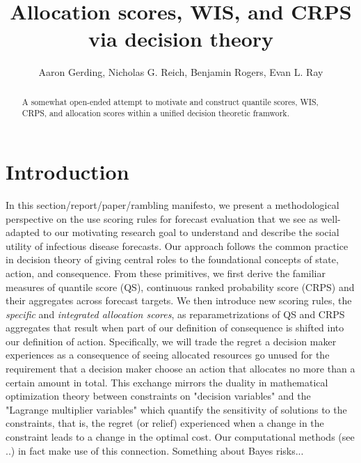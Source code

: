 \documentclass{article}
\title{Allocation scores, WIS, and CRPS via decision theory}
\author{Aaron Gerding, Nicholas G. Reich, Benjamin Rogers, Evan L. Ray}
\begin{document}
\newcommand{\del}[2]{\frac{\partial {#1} }{\partial {#2}} }
\newcommand{\dby}[2]{\frac{d {#1} }{d {#2}} }
\newcommand{\sbar}{\overline{s}}
\newtheorem{proposition}{Proposition}

\theoremstyle{remark}
\newtheorem*{remark}{Remark}

\maketitle

\begin{abstract}

A somewhat open-ended attempt to motivate and construct quantile scores, WIS, CRPS, and allocation scores within a unified decision theoretic framwork.

\end{abstract}

\section{Introduction}

In this section/report/paper/rambling manifesto, we present a methodological perspective on the use scoring rules for forecast evaluation that we see as well-adapted to our motivating research goal to understand and describe the social utility of infectious disease forecasts. Our approach follows the common practice in decision theory of giving central roles to the foundational concepts of state, action, and consequence. From these primitives, we first derive the familiar measures of quantile score (QS), continuous ranked probability score (CRPS) and their aggregates across forecast targets.  We then introduce new scoring rules, the \emph{specific} and \emph{integrated allocation scores}, as reparametrizations of QS and CRPS aggregates that result when part of our definition of consequence is shifted into our definition of action. Specifically, we will trade the regret a decision maker experiences as a consequence of seeing allocated resources go unused for the requirement that a decision maker choose an action that allocates no more than a certain amount in total. This exchange mirrors the duality in mathematical optimization theory between constraints on "decision variables" and the "Lagrange multiplier variables" which quantify the sensitivity of solutions to the constraints, that is, the regret (or relief) experienced when a change in the constraint leads to a change in the optimal cost.
Our computational methods (see ..) in fact make use of this connection.
Something about Bayes risks...
\end{document}
